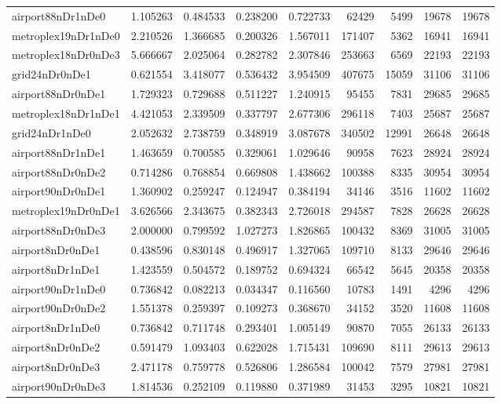 \begin{longtable}{|l|r|r|r|r|r|r|r|r|}
airport88nDr1nDe0 & 1.105263 & 0.484533 & 0.238200 & 0.722733 & 62429 & 5499 & 19678 & 19678 \\
metroplex19nDr1nDe0 & 2.210526 & 1.366685 & 0.200326 & 1.567011 & 171407 & 5362 & 16941 & 16941 \\
metroplex18nDr0nDe3 & 5.666667 & 2.025064 & 0.282782 & 2.307846 & 253663 & 6569 & 22193 & 22193 \\
grid24nDr0nDe1 & 0.621554 & 3.418077 & 0.536432 & 3.954509 & 407675 & 15059 & 31106 & 31106 \\
airport88nDr0nDe1 & 1.729323 & 0.729688 & 0.511227 & 1.240915 & 95455 & 7831 & 29685 & 29685 \\
metroplex18nDr1nDe1 & 4.421053 & 2.339509 & 0.337797 & 2.677306 & 296118 & 7403 & 25687 & 25687 \\
grid24nDr1nDe0 & 2.052632 & 2.738759 & 0.348919 & 3.087678 & 340502 & 12991 & 26648 & 26648 \\
airport88nDr1nDe1 & 1.463659 & 0.700585 & 0.329061 & 1.029646 & 90958 & 7623 & 28924 & 28924 \\
airport88nDr0nDe2 & 0.714286 & 0.768854 & 0.669808 & 1.438662 & 100388 & 8335 & 30954 & 30954 \\
airport90nDr0nDe1 & 1.360902 & 0.259247 & 0.124947 & 0.384194 & 34146 & 3516 & 11602 & 11602 \\
metroplex19nDr0nDe1 & 3.626566 & 2.343675 & 0.382343 & 2.726018 & 294587 & 7828 & 26628 & 26628 \\
airport88nDr0nDe3 & 2.000000 & 0.799592 & 1.027273 & 1.826865 & 100432 & 8369 & 31005 & 31005 \\
airport8nDr0nDe1 & 0.438596 & 0.830148 & 0.496917 & 1.327065 & 109710 & 8133 & 29646 & 29646 \\
airport8nDr1nDe1 & 1.423559 & 0.504572 & 0.189752 & 0.694324 & 66542 & 5645 & 20358 & 20358 \\
airport90nDr1nDe0 & 0.736842 & 0.082213 & 0.034347 & 0.116560 & 10783 & 1491 & 4296 & 4296 \\
airport90nDr0nDe2 & 1.551378 & 0.259397 & 0.109273 & 0.368670 & 34152 & 3520 & 11608 & 11608 \\
airport8nDr1nDe0 & 0.736842 & 0.711748 & 0.293401 & 1.005149 & 90870 & 7055 & 26133 & 26133 \\
airport8nDr0nDe2 & 0.591479 & 1.093403 & 0.622028 & 1.715431 & 109690 & 8111 & 29613 & 29613 \\
airport8nDr0nDe3 & 2.471178 & 0.759778 & 0.526806 & 1.286584 & 100042 & 7579 & 27981 & 27981 \\
airport90nDr0nDe3 & 1.814536 & 0.252109 & 0.119880 & 0.371989 & 31453 & 3295 & 10821 & 10821 \\

\end{longtable}

